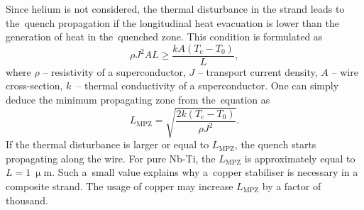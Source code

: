 Since helium is not considered, the thermal disturbance in the strand leads to the~quench propagation if the longitudinal heat evacuation is lower than the generation of heat in the~quenched zone. This condition is formulated as
\begin{equation}
    \rho J^2 A L \geq \frac{kA(T_\text{c}-T_0)}{L},
\end{equation}
where $\rho$ -- resistivity of a superconductor, $J$ -- transport current density, $A$ -- wire cross-section, $k$~-- thermal conductivity of a superconductor. One can simply deduce the minimum propagating zone from the~equation as~\cite[p.~124]{superconducting_accelerator_magnets}
\begin{equation}
    L_\text{MPZ} = \sqrt{\frac{2k(T_\text{c}-T_0)}{\rho J^2}}.
\end{equation}
If the thermal disturbance is larger or equal to $L_\text{MPZ}$, the quench starts propagating along the wire. For pure Nb-Ti, the $L_\text{MPZ}$ is approximately equal to $L=1~\upmu \text{m}$. Such a~small value explains why a~copper stabiliser is necessary in a composite strand. The usage of copper may increase $L_\text{MPZ}$ by a factor of thousand. ~\cite[p.~124]{superconducting_accelerator_magnets}





